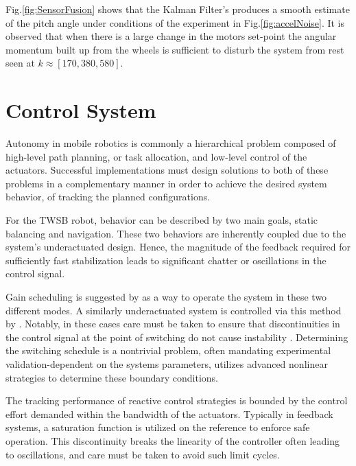        
        Fig.\ref{fig:SensorFusion} shows that the Kalman Filter's produces a smooth estimate of the pitch angle
        under conditions of the experiment in Fig.\ref{fig:accelNoise}. It is observed that when there is a 
        large change in the motors set-point  the angular momentum built up from the wheels is sufficient to 
        disturb the system from rest seen at $k \approx [170, 380, 580]$.
        \pagebreak{}

    \section{Control System}
        Autonomy in mobile robotics is commonly a hierarchical problem composed of high-level path planning, 
        or task allocation, and low-level control of the actuators.  
        Successful implementations must design solutions to both of these problems in a complementary manner in order 
        to achieve the desired system behavior, of tracking the planned configurations.
            
        For the TWSB robot, behavior can be described by two main goals, static balancing and navigation.
        These two behaviors are inherently coupled due to the system's underactuated design. Hence, the 
        magnitude of the feedback required for sufficiently fast stabilization leads to significant chatter or oscillations 
        in the control signal.

        Gain scheduling is suggested by \cite{refvem2019design}
        as a way to operate the system in these two different modes. A similarly underactuated system is controlled via this 
        method by \cite{wanggain}. Notably, in these cases care must be taken to ensure 
        that discontinuities in the control signal at the point of switching do not cause instability \cite{hespanha2002switching}.
        Determining the switching schedule is a nontrivial problem, often mandating experimental validation-dependent 
        on the systems parameters, \cite{RoboLimbo} utilizes advanced nonlinear strategies to determine these
        boundary conditions.

        The tracking performance of reactive control strategies is bounded by the control effort 
        demanded within the bandwidth of the actuators. Typically in feedback systems, a saturation function 
        is utilized on the reference to enforce safe operation. This discontinuity breaks the linearity of the 
        controller often leading to oscillations, and care must be taken to avoid such limit cycles.
            
